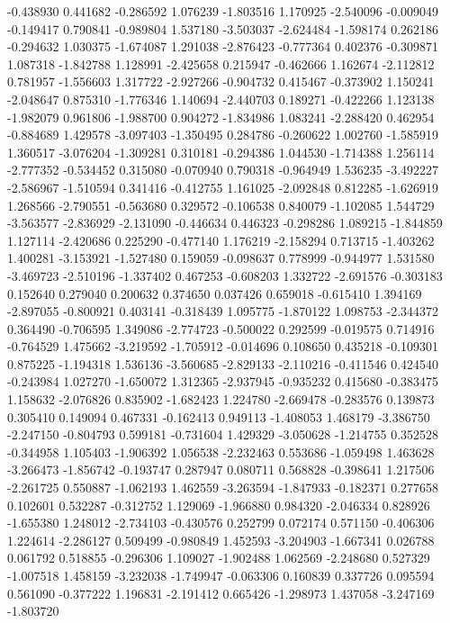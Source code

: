 -0.438930
0.441682
-0.286592
1.076239
-1.803516
1.170925
-2.540096
-0.009049
-0.149417
0.790841
-0.989804
1.537180
-3.503037
-2.624484
-1.598174
0.262186
-0.294632
1.030375
-1.674087
1.291038
-2.876423
-0.777364
0.402376
-0.309871
1.087318
-1.842788
1.128991
-2.425658
0.215947
-0.462666
1.162674
-2.112812
0.781957
-1.556603
1.317722
-2.927266
-0.904732
0.415467
-0.373902
1.150241
-2.048647
0.875310
-1.776346
1.140694
-2.440703
0.189271
-0.422266
1.123138
-1.982079
0.961806
-1.988700
0.904272
-1.834986
1.083241
-2.288420
0.462954
-0.884689
1.429578
-3.097403
-1.350495
0.284786
-0.260622
1.002760
-1.585919
1.360517
-3.076204
-1.309281
0.310181
-0.294386
1.044530
-1.714388
1.256114
-2.777352
-0.534452
0.315080
-0.070940
0.790318
-0.964949
1.536235
-3.492227
-2.586967
-1.510594
0.341416
-0.412755
1.161025
-2.092848
0.812285
-1.626919
1.268566
-2.790551
-0.563680
0.329572
-0.106538
0.840079
-1.102085
1.544729
-3.563577
-2.836929
-2.131090
-0.446634
0.446323
-0.298286
1.089215
-1.844859
1.127114
-2.420686
0.225290
-0.477140
1.176219
-2.158294
0.713715
-1.403262
1.400281
-3.153921
-1.527480
0.159059
-0.098637
0.778999
-0.944977
1.531580
-3.469723
-2.510196
-1.337402
0.467253
-0.608203
1.332722
-2.691576
-0.303183
0.152640
0.279040
0.200632
0.374650
0.037426
0.659018
-0.615410
1.394169
-2.897055
-0.800921
0.403141
-0.318439
1.095775
-1.870122
1.098753
-2.344372
0.364490
-0.706595
1.349086
-2.774723
-0.500022
0.292599
-0.019575
0.714916
-0.764529
1.475662
-3.219592
-1.705912
-0.014696
0.108650
0.435218
-0.109301
0.875225
-1.194318
1.536136
-3.560685
-2.829133
-2.110216
-0.411546
0.424540
-0.243984
1.027270
-1.650072
1.312365
-2.937945
-0.935232
0.415680
-0.383475
1.158632
-2.076826
0.835902
-1.682423
1.224780
-2.669478
-0.283576
0.139873
0.305410
0.149094
0.467331
-0.162413
0.949113
-1.408053
1.468179
-3.386750
-2.247150
-0.804793
0.599181
-0.731604
1.429329
-3.050628
-1.214755
0.352528
-0.344958
1.105403
-1.906392
1.056538
-2.232463
0.553686
-1.059498
1.463628
-3.266473
-1.856742
-0.193747
0.287947
0.080711
0.568828
-0.398641
1.217506
-2.261725
0.550887
-1.062193
1.462559
-3.263594
-1.847933
-0.182371
0.277658
0.102601
0.532287
-0.312752
1.129069
-1.966880
0.984320
-2.046334
0.828926
-1.655380
1.248012
-2.734103
-0.430576
0.252799
0.072174
0.571150
-0.406306
1.224614
-2.286127
0.509499
-0.980849
1.452593
-3.204903
-1.667341
0.026788
0.061792
0.518855
-0.296306
1.109027
-1.902488
1.062569
-2.248680
0.527329
-1.007518
1.458159
-3.232038
-1.749947
-0.063306
0.160839
0.337726
0.095594
0.561090
-0.377222
1.196831
-2.191412
0.665426
-1.298973
1.437058
-3.247169
-1.803720
